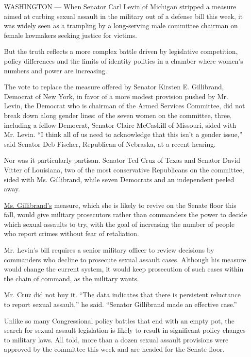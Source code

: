 WASHINGTON --- When Senator Carl Levin of Michigan stripped a measure
aimed at curbing sexual assault in the military out of a defense bill
this week, it was widely seen as a trampling by a long-serving male
committee chairman on female lawmakers seeking justice for victims.

But the truth reflects a more complex battle driven by legislative
competition, policy differences and the limits of identity politics in a
chamber where women's numbers and power are increasing.

The vote to replace the measure offered by Senator Kirsten E.
Gillibrand, Democrat of New York, in favor of a more modest provision
pushed by Mr. Levin, the Democrat who is chairman of the Armed Services
Committee, did not break down along gender lines: of the seven women on
the committee, three, including a fellow Democrat, Senator Claire
McCaskill of Missouri, sided with Mr. Levin. ``I think all of us need to
acknowledge that this isn't a gender issue,'' said Senator Deb Fischer,
Republican of Nebraska, at a recent hearing.

Nor was it particularly partisan. Senator Ted Cruz of Texas and Senator
David Vitter of Louisiana, two of the most conservative Republicans on
the committee, sided with Ms. Gillibrand, while seven Democrats and an
independent peeled away.

\href{http://topics.nytimes.com/top/reference/timestopics/people/g/kirsten_gillibrand/index.html?inline1=nyt-per}{Ms.
Gillibrand's} measure, which she is likely to revive on the Senate floor
this fall, would give military prosecutors rather than commanders the
power to decide which sexual assaults to try, with the goal of
increasing the number of people who report crimes without fear of
retaliation.

Mr. Levin's bill requires a senior military officer to review decisions
by commanders who decline to prosecute sexual assault cases. Although
his measure would change the current system, it would keep prosecution
of such cases within the chain of command, as the military wants.

Mr. Cruz did not buy it. ``The data indicates that there is persistent
reluctance to report sexual assault,'' he said. ``Senator Gillibrand
made an effective case.''

Unlike so many Congressional policy battles that end with an empty pot,
the search for sexual assault legislation is likely to result in
significant policy changes to military laws. All told, more than a dozen
sexual assault provisions were approved by the committee this week and
are headed for the Senate floor.

